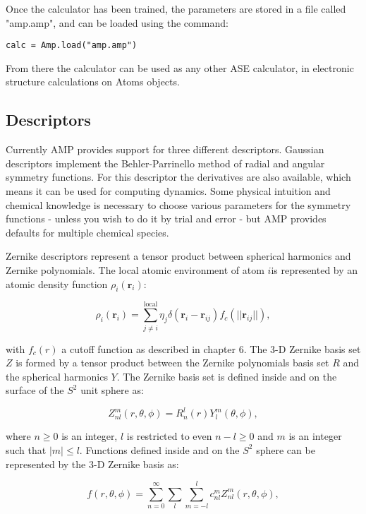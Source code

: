 Once the calculator has been trained, the parameters
are stored in a file called "amp.amp",
and can be loaded using the command:

\begin{lstlisting}
calc = Amp.load("amp.amp")
\end{lstlisting}

From there the calculator can be used as any other ASE calculator,
in electronic structure calculations on Atoms objects.

\subsection{Descriptors}
Currently AMP provides support for three different descriptors.
Gaussian descriptors implement the Behler-Parrinello method
of radial and angular symmetry functions. For this descriptor
the derivatives are also available, which means it can be used
for computing dynamics. Some physical intuition and chemical knowledge
is necessary to choose various parameters for the symmetry functions -
unless you wish to do it by trial and error - but AMP provides
defaults for multiple chemical species.
\par
Zernike descriptors represent a tensor product between spherical
harmonics and Zernike polynomials. The local atomic environment
of atom $i$is represented by an atomic density function $\rho_i(\bm{r}_i)$:


$$ \rho_i(\bm{r}_i) = \sum_{j\neq i}^{\text{local}}
    \eta_j \delta \left( \bm{r}_i - \bm{r}_{ij} \right)
    f_c \left( \lvert \lvert \bm{r}_{ij} \rvert \rvert \right) , $$

with $f_c(r)$ a cutoff function as described in chapter 6.
The 3-D Zernike basis set $Z$ is formed by a tensor product between
the Zernike polynomials basis set $R$ and the spherical harmonics
$Y$. The Zernike basis set is defined inside and on the surface
of the $S^2$ unit sphere as:

$$ Z_{nl}^m (r, \theta, \phi) = R_n^l(r) Y_l^m(\theta, \phi) , $$

where $n \geq 0$ is an integer, $l$ is restricted to even $n - l \geq 0$
and $m$ is an integer such that $\left| m \right| \leq l$.
Functions defined inside and on the $S^2$ sphere
can be represented by the 3-D Zernike basis as:

$$ f(r, \theta, \phi) = \sum_{n=0}^{\infty} \sum_l \sum_{m=-l}^l
    c_{nl}^m Z_{nl}^m (r, \theta, \phi) , $$

